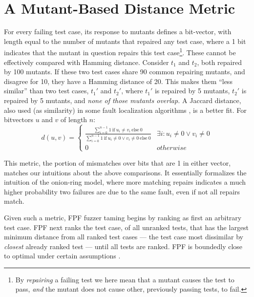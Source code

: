 \section{A Mutant-Based Distance Metric}

For every failing test case, its response to mutants defines a bit-vector, with
length equal to the number of mutants that repaired any test case,
where a 1 bit indicates that the mutant in question repairs this test
case\footnote{By \emph{repairing} a failing test we here mean that a mutant
causes the test to pass, \emph{and} the mutant does not cause
other, previously passing tests, to fail.}.  These cannot be effectively compared with Hamming distance. Consider $t_1$ and $t_2$, both repaired
by 100 mutants.  If these two test cases share 90 common repairing
mutants, and disagree for 10, they have a Hamming
distance of 20.  This makes them ``less similar'' than two test cases,
$t_1'$ and $t_2'$, where $t_1'$ is repaired by 5 mutants, $t_2'$ is
repaired by 5 mutants, and \emph{none of those mutants overlap.}   A Jaccard distance, also used (as similarity) in some fault
localization algorithms \cite{Pinpoint}, is a better fit.  For bitvectors $u$ and $v$ of length $n$:
\[d(u,v) = 
\begin{cases}
\frac{\sum_{i=0}^{n-1} 1\ \text{if}\ u_i \neq v_i\ \text{else}\ 0}{\sum_{i=0}^{n-1} 1
\  \text{if}\ u_i \neq 0 \vee v_i \neq 0\ \text{else}\ 0} & \exists i:u_i\neq 0 \vee v_i\neq 0\\
0 & otherwise
\end{cases}
\]

This metric, the portion of mismatches over bits that are 1 in either
vector, matches our intuitions about the above comparisons.  It
essentially formalizes the intuition of the onion-ring model, where
more matching repairs indicates a much higher probability two failures
are due to the same fault, even if not all repairs match.

Given such a metric, FPF \cite{Gonzalez} fuzzer taming \cite{PLDI13}
begins by ranking as first an arbitrary test case.   FPF next ranks the test
case, of all unranked tests, that has the largest minimum distance
from all ranked test cases --- the test case most dissimilar by \emph{closest}
already ranked test --- until all tests are ranked.  FPF is boundedly close
to optimal under certain assumptions \cite{Gonzalez}.

